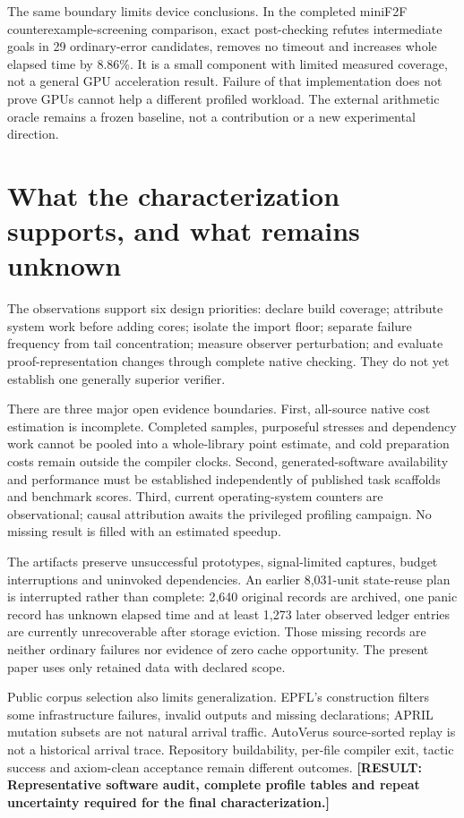 \documentclass[10pt,twocolumn]{article}
\newcommand{\missing}[1]{\textbf{[RESULT: #1]}}
\begin{document}
The same boundary limits device conclusions.
In the completed miniF2F counterexample-screening comparison, exact
post-checking refutes intermediate goals in 29 ordinary-error candidates,
removes no timeout and increases whole elapsed time by 8.86\%.
It is a small component with limited measured coverage, not a general GPU
acceleration result. Failure of that implementation does not prove GPUs
cannot help a different profiled workload.
The external arithmetic oracle remains a frozen baseline, not a contribution
or a new experimental direction.

\section{What the characterization supports, and what remains unknown}
\label{sec:limits}
The observations support six design priorities: declare build coverage;
attribute system work before adding cores; isolate the import floor;
separate failure frequency from tail concentration; measure observer
perturbation; and evaluate proof-representation changes through complete
native checking. They do not yet establish one generally superior verifier.

There are three major open evidence boundaries.
First, all-source native cost estimation is incomplete. Completed samples,
purposeful stresses and dependency work cannot be pooled into a whole-library
point estimate, and cold preparation costs remain outside the compiler
clocks. Second, generated-software availability and performance must be
established independently of published task scaffolds and benchmark scores.
Third, current operating-system counters are observational; causal attribution
awaits the privileged profiling campaign. No missing result is filled with
an estimated speedup.

The artifacts preserve unsuccessful prototypes, signal-limited captures,
budget interruptions and uninvoked dependencies.
An earlier 8,031-unit state-reuse plan is interrupted rather than complete:
2,640 original records are archived, one panic record has unknown elapsed
time and at least 1,273 later observed ledger entries are currently
unrecoverable after storage eviction.
Those missing records are neither ordinary failures nor evidence of zero
cache opportunity. The present paper uses only retained data with declared
scope.

Public corpus selection also limits generalization. EPFL's construction
filters some infrastructure failures, invalid outputs and missing
declarations; APRIL mutation subsets are not natural arrival traffic.
AutoVerus source-sorted replay is not a historical arrival trace.
Repository buildability, per-file compiler exit, tactic success and
axiom-clean acceptance remain different outcomes.
\missing{Representative software audit, complete profile tables and
repeat uncertainty required for the final characterization.}
\end{document}
